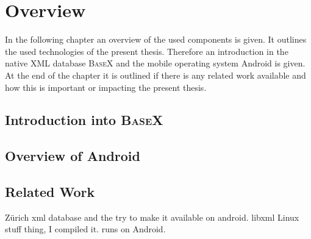 \chapter{Overview}
\label{cha:overview}
In the following chapter an overview of the used components is given.
It outlines the used technologies of the present thesis.
Therefore an introduction in the native XML database \textsc{BaseX} and the mobile operating system Android is given.
At the end of the chapter it is outlined if there is any related work available and how this is important or impacting the present thesis.





%

\section{Introduction into \textsc{BaseX}}
\label{sec:overview:introduction-into-basex}

\section{Overview of Android}
\label{sec:overview:overview-of-android}

\section{Related Work}
\label{sec:overview:related-work}
Zürich xml database and the try to make it available on android.
libxml Linux stuff thing, I compiled it. runs on Android.
